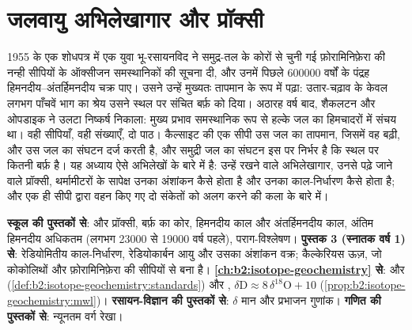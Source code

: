 \chapter{जलवायु अभिलेखागार और प्रॉक्सी}\label{ch:b2:climate-proxies}

1955 के एक शोधपत्र में एक युवा भू-रसायनविद ने समुद्र-तल के कोरों से चुनी गई फ़ोरामिनिफ़ेरा की नन्ही
सीपियों के ऑक्सीजन समस्थानिकों की सूचना दी, और उनमें पिछले \num{600000} वर्षों के पंद्रह हिमनदीय--अंतर्हिमनदीय चक्र
पाए। उसने उन्हें मुख्यतः तापमान के रूप में पढ़ा: उतार-चढ़ाव के केवल लगभग पाँचवें भाग का श्रेय उसने
स्थल पर संचित बर्फ़ को दिया। अठारह वर्ष बाद, शैकलटन और ओपडाइक ने उलटा निष्कर्ष निकाला:
मुख्य प्रभाव समस्थानिक रूप से हल्के जल का हिमचादरों में संचय था। वही सीपियाँ, वही संख्याएँ, दो पाठ।
कैल्साइट की एक सीपी उस जल का तापमान, जिसमें वह बढ़ी, और उस जल का संघटन दर्ज करती है, और समुद्री
जल का संघटन इस पर निर्भर है कि स्थल पर कितनी बर्फ़ है। यह अध्याय ऐसे अभिलेखों के बारे में है: उन्हें
रखने वाले अभिलेखागार, उनसे पढ़े जाने वाले प्रॉक्सी, थर्मामीटरों के सापेक्ष उनका अंशांकन कैसे होता है
और उनका काल-निर्धारण कैसे होता है; और एक ही सीपी द्वारा वहन किए गए दो संकेतों को अलग करने
की कला के बारे में।

\begin{recall}
\textbf{स्कूल की पुस्तकों से}:  और प्रॉक्सी, बर्फ़ का कोर, हिमनदीय काल और
अंतर्हिमनदीय काल, अंतिम हिमनदीय अधिकतम (लगभग \num{23000} से \num{19000} वर्ष पहले), पराग-विश्लेषण।
\textbf{पुस्तक 3 (स्नातक वर्ष 1) से}: रेडियोमितीय काल-निर्धारण, रेडियोकार्बन आयु और उसका
अंशांकन वक्र; कैल्केरियस ऊज़, जो कोकोलिथों और फ़ोरामिनिफ़ेरा की सीपियों से बना है।
\textbf{\cref{ch:b2:isotope-geochemistry} से}:   और 
(\cref{def:b2:isotope-geochemistry:standards}) और , $\delta\mathrm{D}
\approx 8\,\delta^{18}\mathrm{O} + 10$ (\cref{prop:b2:isotope-geochemistry:mwl})। \textbf{रसायन-विज्ञान
की पुस्तकों से}: $\delta$ मान और प्रभाजन गुणांक। \textbf{गणित की
पुस्तकों से}: न्यूनतम वर्ग रेखा।
\end{recall}

